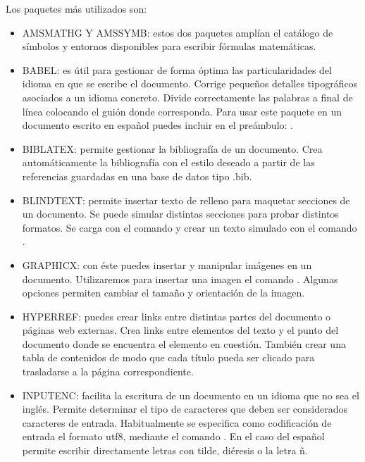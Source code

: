 \documentclass[11pt, a4paper]{article}
\begin{document}
Los paquetes más utilizados son:
\begin{itemize}
\item AMSMATHG Y AMSSYMB: estos dos paquetes amplían el catálogo de símbolos y entornos disponibles para escribir fórmulas matemáticas.

\item BABEL: es útil para gestionar de forma óptima las particularidades del idioma en que se escribe el documento. Corrige pequeños detalles tipográficos asociados a un idioma concreto. Divide correctamente las palabras a final de línea colocando el guión donde corresponda. Para usar este paquete en un documento escrito en español puedes incluir en el preámbulo: .

\item BIBLATEX: permite gestionar la bibliografía de un documento. Crea automáticamente la bibliografía con el estilo deseado a partir de las referencias guardadas en una base de datos tipo .bib.

\item BLINDTEXT: permite insertar texto de relleno para maquetar secciones de un documento. Se puede simular distintas secciones para probar distintos formatos. Se carga con el comando  y crear un texto simulado con el comando .

\item GRAPHICX: con éste puedes insertar y manipular imágenes en un documento. Utilizaremos para insertar una imagen el comando . Algunas opciones permiten cambiar el tamaño y orientación de la imagen.

\item HYPERREF: puedes crear links entre distintas partes del documento o páginas web externas. Crea links entre elementos del texto y el punto del documento donde se encuentra el elemento en cuestión. También crear una tabla de contenidos de modo que cada título pueda ser clicado para trasladarse a la página correspondiente.

\item INPUTENC: facilita la escritura de un documento en un idioma que no sea el inglés. Permite determinar el tipo de caracteres que deben ser considerados caracteres de entrada. Habitualmente se especifica como codificación de entrada el formato utf8, mediante el comando . En el caso del español permite escribir directamente letras con tilde, diéresis o la letra ñ.


\end{itemize}
\end{document}
